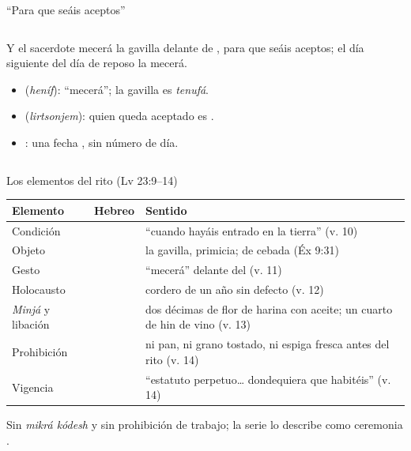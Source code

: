 \begin{frame}{``Para que seáis aceptos''}
\begin{columns}[c,onlytextwidth]
\begin{column}{0.57\textwidth}
\begin{cita}Y el sacerdote mecerá la gavilla delante de \SENOR, para que seáis aceptos; el día siguiente del día de reposo la mecerá.\end{cita}
\small
\begin{itemize}
\item {} (\emph{heníf}): ``mecerá''; la gavilla es \emph{tenufá}.
\item {} (\emph{lirtsonjem}): quien queda aceptado es .
\item {}: una fecha , sin número de día.
\end{itemize}
\end{column}
\begin{column}{0.41\textwidth}\end{column}
\end{columns}
\end{frame}

\begin{frame}{Los elementos del rito (Lv 23:9--14)}
\scriptsize\renewcommand{\arraystretch}{1.12}
\begin{tabular}{@{}L{2.2cm}L{3.3cm}L{6.4cm}@{}}
\toprule
\textbf{Elemento} & \textbf{Hebreo} & \textbf{Sentido} \\ \midrule
Condición &  & ``cuando hayáis entrado en la tierra'' (v. 10) \\
Objeto &  & la gavilla, primicia; de cebada (Éx 9:31) \\
Gesto &  & ``mecerá'' delante del \SENOR{} (v. 11) \\
Holocausto &  & cordero de un año sin defecto (v. 12) \\
\emph{Minjá} y libación &  & dos décimas de flor de harina con aceite; un cuarto de hin de vino (v. 13) \\
Prohibición &  & ni pan, ni grano tostado, ni espiga fresca antes del rito (v. 14) \\
Vigencia &  & ``estatuto perpetuo\ldots{} dondequiera que habitéis'' (v. 14) \\
\bottomrule
\end{tabular}\par\medskip
\small\RaggedRight Sin \emph{mikrá kódesh} y sin prohibición de trabajo; la serie lo describe como ceremonia .
\end{frame}

